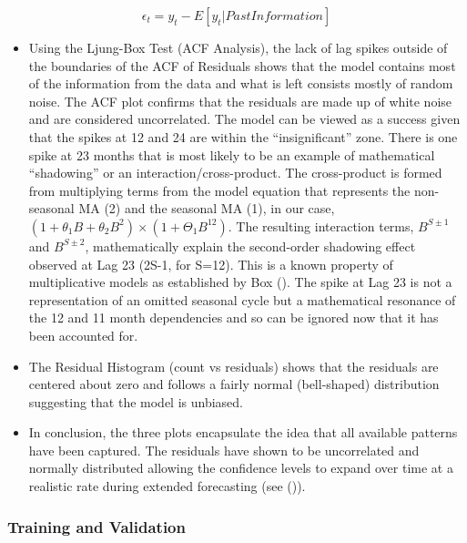 \documentclass[
  letterpaper,
  DIV=11,
  numbers=noendperiod]{scrartcl}
\begin{document}
\[ 
    \epsilon_t = y_t - E[y_t|PastInformation] 
\]

\begin{itemize}
\item
  Using the Ljung-Box Test (ACF Analysis), the lack of lag spikes
  outside of the boundaries of the ACF of Residuals shows that the model
  contains most of the information from the data and what is left
  consists mostly of random noise. The ACF plot confirms that the
  residuals are made up of white noise and are considered uncorrelated.
  The model can be viewed as a success given that the spikes at 12 and
  24 are within the ``insignificant'' zone. There is one spike at 23
  months that is most likely to be an example of mathematical
  ``shadowing'' or an interaction/cross-product. The cross-product is
  formed from multiplying terms from the model equation that represents
  the non-seasonal MA (2) and the seasonal MA (1), in our case,
  \((1+\theta_1 B+\theta_2 B^2) \times (1+\Theta_1 B^{12})\). The
  resulting interaction terms, \(B^{S\pm 1}\) and \(B^{S\pm 2}\),
  mathematically explain the second-order shadowing effect observed at
  Lag 23 (2S-1, for S=12). This is a known property of multiplicative
  models as established by Box ().
  The spike at Lag 23 is not a representation of an omitted seasonal
  cycle but a mathematical resonance of the 12 and 11 month dependencies
  and so can be ignored now that it has been accounted for.
\item
  The Residual Histogram (count vs residuals) shows that the residuals
  are centered about zero and follows a fairly normal (bell-shaped)
  distribution suggesting that the model is unbiased.
\item
  In conclusion, the three plots encapsulate the idea that all available
  patterns have been captured. The residuals have shown to be
  uncorrelated and normally distributed allowing the confidence levels
  to expand over time at a realistic rate during extended forecasting
  (see ()).
\end{itemize}

\subsubsection{Training and Validation}\label{training-and-validation-1}
\end{document}
